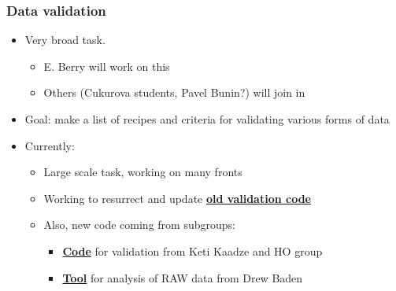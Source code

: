 \documentclass[bigger]{beamer}
\providecommand{\alert}[1]{\textbf{#1}}
\begin{document}
\begin{frame}
\frametitle{Data validation}
\label{sec-1-1-2}
\begin{itemize}

\item Very broad task.
\label{sec-1-1-2-1}%
\begin{itemize}

\item E. Berry will work on this
\label{sec-1-1-2-1-1}%

\item Others (Cukurova students, Pavel Bunin?) will join in
\label{sec-1-1-2-1-2}%
\end{itemize} %

\item Goal: make a list of recipes and criteria for validating various forms of data
\label{sec-1-1-2-2}%

\item Currently:
\label{sec-1-1-2-3}%
\begin{itemize}

\item Large scale task, working on many fronts
\label{sec-1-1-2-3-1}%

\item Working to resurrect and update \href{https://twiki.cern.ch/twiki/bin/viewauth/CMS/HcalPFGRecipesan}{\alert{old validation code}}
\label{sec-1-1-2-3-2}%

\item Also, new code coming from subgroups:
\label{sec-1-1-2-3-3}%
\begin{itemize}

\item \href{https://git.cern.ch/web/HO.git}{\alert{Code}} for validation from Keti Kaadze and HO group
\label{sec-1-1-2-3-3-1}%

\item \href{https://github.com/HCALPFG/RawAnalyzer}{\alert{Tool}} for analysis of RAW data from Drew Baden
\label{sec-1-1-2-3-3-2}%
\end{itemize} %
\end{itemize} %
\end{itemize} %
\end{frame}
\end{document}
